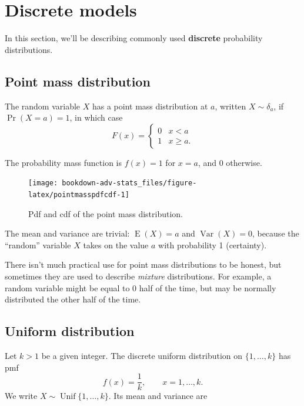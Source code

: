 \documentclass[
]{book}
\DeclareMathOperator{\E}{E}
\DeclareMathOperator{\Var}{Var}
\DeclareMathOperator{\Unif}{Unif}
\theoremstyle{definition}
\theoremstyle{definition}
\theoremstyle{definition}
\theoremstyle{definition}
\theoremstyle{remark}
\begin{document}
\hypertarget{discrete-models}{%
\section{Discrete models}\label{discrete-models}}

In this section, we'll be describing commonly used \textbf{discrete} probability distributions.

\hypertarget{point-mass-distribution}{%
\subsection{Point mass distribution}\label{point-mass-distribution}}

The random variable \(X\) has a point mass distribution at \(a\), written \(X\sim \delta_a\), if \(\Pr(X=a) = 1\), in which case
\[
F(x) = \begin{cases}
0 &x<a \\
1 &x\geq a.
\end{cases}
\]

The probability mass function is \(f(x)=1\) for \(x=a\), and 0 otherwise.

\begin{figure}

{\centering \texttt{[image: bookdown-adv-stats\_files/figure-latex/pointmasspdfcdf-1]} 

}

\caption{Pdf and cdf of the point mass distribution.}\label{fig:pointmasspdfcdf}
\end{figure}

The mean and variance are trivial: \(\E(X)=a\) and \(\Var(X)=0\), because the ``random'' variable \(X\) takes on the value \(a\) with probability 1 (certainty).

There isn't much practical use for point mass distributions to be honest, but sometimes they are used to describe \emph{mixture} distributions.
For example, a random variable might be equal to \(0\) half of the time, but may be normally distributed the other half of the time.

\hypertarget{uniform-distribution}{%
\subsection{Uniform distribution}\label{uniform-distribution}}

Let \(k>1\) be a given integer. The discrete uniform distribution on \(\{1,\dots,k\}\) has pmf
\[
f(x) = \frac{1}{k}, \hspace{2em} x=1,\dots,k.
\]
We write \(X\sim\Unif\{1,\dots,k\}\). Its mean and variance are
\end{document}
